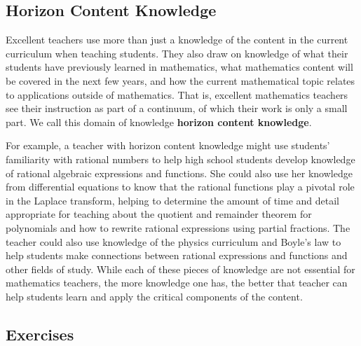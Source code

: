 \documentclass[
]{book}
\theoremstyle{definition}
\theoremstyle{definition}
\theoremstyle{definition}
\theoremstyle{definition}
\theoremstyle{remark}
\begin{document}
\hypertarget{horizon-content-knowledge}{%
\subsection{Horizon Content Knowledge}\label{horizon-content-knowledge}}

Excellent teachers use more than just a knowledge of the content in the current curriculum when teaching students. They also draw on knowledge of what their students have previously learned in mathematics, what mathematics content will be covered in the next few years, and how the current mathematical topic relates to applications outside of mathematics. That is, excellent mathematics teachers see their instruction as part of a continuum, of which their work is only a small part. We call this domain of knowledge \textbf{horizon content knowledge}.

For example, a teacher with horizon content knowledge might use students' familiarity with rational numbers to help high school students develop knowledge of rational algebraic expressions and functions. She could also use her knowledge from differential equations to know that the rational functions play a pivotal role in the Laplace transform, helping to determine the amount of time and detail appropriate for teaching about the quotient and remainder theorem for polynomials and how to rewrite rational expressions using partial fractions. The teacher could also use knowledge of the physics curriculum and Boyle's law to help students make connections between rational expressions and functions and other fields of study. While each of these pieces of knowledge are not essential for mathematics teachers, the more knowledge one has, the better that teacher can help students learn and apply the critical components of the content.

\hypertarget{exercises}{%
\subsection{Exercises}\label{exercises}}
\end{document}
